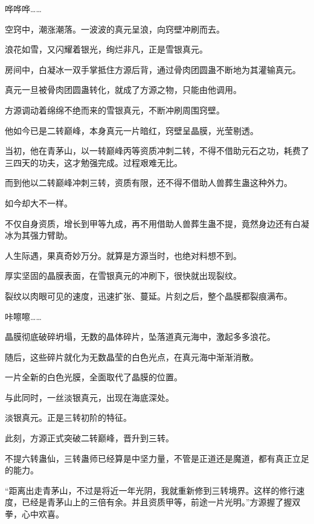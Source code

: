 
\begin{this_body}



哗哗哗……

空窍中，潮涨潮落。一波波的真元呈浪，向窍壁冲刷而去。

浪花如雪，又闪耀着银光，绚烂非凡，正是雪银真元。

房间中，白凝冰一双手掌抵住方源后背，通过骨肉团圆蛊不断地为其灌输真元。

真元一旦被骨肉团圆蛊转化，就成了方源之物，只能由他调用。

方源调动着绵绵不绝而来的雪银真元，不断冲刷周围窍壁。

他如今已是二转巅峰，本身真元一片暗红，窍壁呈晶膜，光莹剔透。

当初，他在青茅山，以一转巅峰丙等资质冲刺二转，不得不借助元石之功，耗费了三四天的功夫，这才勉强完成。过程艰难无比。

而到他以二转巅峰冲刺三转，资质有限，还不得不借助人兽葬生蛊这种外力。

如今却大不一样。

不仅自身资质，增长到甲等九成，再不用借助人兽葬生蛊不提，竟然身边还有白凝冰为其强力臂助。

人生际遇，果真奇妙万分。就算是方源当时，也绝对料想不到。

厚实坚固的晶膜表面，在雪银真元的冲刷下，很快就出现裂纹。

裂纹以肉眼可见的速度，迅速扩张、蔓延。片刻之后，整个晶膜都裂痕满布。

咔嚓嚓……

晶膜彻底破碎坍塌，无数的晶体碎片，坠落道真元海中，激起多多浪花。

随后，这些碎片就化为无数晶莹的白色光点，在真元海中渐渐消散。

一片全新的白色光膜，全面取代了晶膜的位置。

与此同时，一丝淡银真元，出现在海底深处。

淡银真元。正是三转初阶的特征。

此刻，方源正式突破二转巅峰，晋升到三转。

不提六转蛊仙，三转蛊师已经算是中坚力量，不管是正道还是魔道，都有真正立足的能力。

“距离出走青茅山，不过是将近一年光阴，我就重新修到三转境界。这样的修行速度，已经是青茅山上的三倍有余。并且资质甲等，前途一片光明。”方源握了握双拳，心中欢喜。


\end{this_body}
